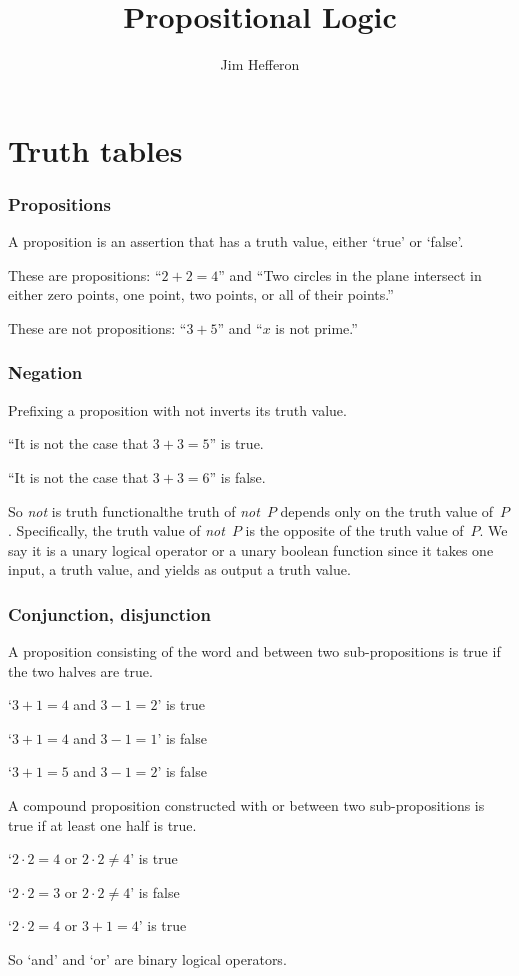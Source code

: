 \documentclass[10pt,t]{beamer}
\title[Propositional Logic] %
{Propositional Logic}
\author{{\small Jim Hef{}feron}}
\institute{
  \texttt{http://joshua.smcvt.edu/proofs}
}
\date{}
\begin{document}
\begin{frame}
  \titlepage
\end{frame}




\section{Truth tables}

\begin{frame}
  \frametitle{Propositions}

A \alert{proposition} is an assertion that has a truth value, 
either `true' or `false'.

\pause
These are propositions: ``$2+2=4$'' 
and ``Two circles in the plane intersect in either zero points, one point,
two points, or all of their points.''

\pause
These are not propositions: ``$3+5$''
and ``$x$ is not prime.''
\end{frame}



\begin{frame}[<+->]
  \frametitle{Negation}

Prefixing a proposition with \alert{not} inverts its truth value.

``It is not the case that $3+3=5$''
is true.

``It is not the case that $3+3=6$''
is false.

\pause
\bigskip
So \textit{not} is \alert{truth functional}\Dash the truth
of \textit{not}~$P$ depends only on the truth value of~$P$.
Specifically, the truth value of \textit{not}~$P$ is 
the opposite of the truth value of~$P$.  
We say it is a \alert{unary logical operator} or 
a \alert{unary boolean function} since it takes one input, a truth value, 
and yields as output a truth value.


\end{frame}


\begin{frame}
  \frametitle{Conjunction, disjunction}

A proposition consisting of the word \alert{and}
between two sub-propositions is true if
the two halves are true.

`$3+1=4$ and 
$3-1=2$'
is true

`$3+1=4$ and 
$3-1=1$'
is false

`$3+1=5$ and 
$3-1=2$'
is false

\pause
\bigskip
A compound proposition constructed with \alert{or}
between two sub-propositions is true if at least one half
is true.

`$2\cdot 2=4$ or 
$2\cdot 2\neq 4$'
is true

`$2\cdot 2=3$ or 
$2\cdot 2\neq 4$'
is false

`$2\cdot 2=4$ or 
$3+1=4$'
is true

\bigskip
\pause
So
`and' and `or'
are \alert{binary logical operators}.
\end{frame}
\end{document}

